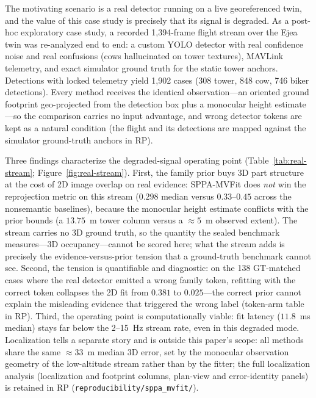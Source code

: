 \documentclass[11pt,a4paper]{article}
\begin{document}
The motivating scenario is a real detector running on a live georeferenced
twin, and the value of this case study is precisely that its signal is
degraded. As a post-hoc exploratory case study, a recorded 1{,}394-frame
flight
stream over the Ejea twin was re-analyzed end to end: a custom YOLO detector
with real confidence noise and real confusions (cows hallucinated on tower
textures), MAVLink telemetry, and exact simulator ground truth for the
static tower anchors. Detections with locked telemetry yield 1{,}902 cases
(308 tower, 848 cow, 746 biker detections). Every method receives the
identical observation---an oriented ground footprint geo-projected from the
detection box plus a monocular height estimate---so the comparison carries
no input advantage, and wrong detector tokens are kept as a natural
condition (the flight and its detections are mapped against the simulator
ground-truth anchors in RP).

Three findings characterize the degraded-signal operating point
(Table~\ref{tab:real-stream}; Figure~\ref{fig:real-stream}). First, the
family prior buys 3D part structure at the cost of 2D image overlap on real
evidence: SPPA-MVFit does \emph{not} win the reprojection metric on this
stream (\(0.298\)
median versus \(0.33\)--\(0.45\) across the nonsemantic baselines), because the monocular
height estimate conflicts with the prior bounds (a \(13.75\)~m tower column
versus
a \(\approx\)\(5\)~m observed extent). The stream carries no 3D ground
truth, so the quantity the sealed benchmark measures---3D occupancy---cannot
be scored here; what the stream adds is precisely the evidence-versus-prior
tension that a ground-truth benchmark cannot see. Second, the tension is
quantifiable and diagnostic: on the 138 GT-matched cases where the real
detector emitted a
wrong family token, refitting with the correct token collapses the 2D fit
from \(0.381\) to \(0.025\)---the correct prior cannot explain the
misleading evidence that triggered the wrong label (token-arm table in
RP). Third, the operating point is computationally
viable: fit latency (\(11.8\)~ms median) stays far below
the 2--15~Hz stream rate, even in this degraded mode. Localization tells a
separate story and is outside this paper's scope: all methods share the same
\(\approx\)\(33\)~m median 3D error, set by the monocular observation
geometry of the low-altitude stream rather than by the fitter; the full
localization analysis (localization and footprint columns, plan-view and
error-identity panels) is retained in RP
(\texttt{reproducibility/sppa\_mvfit/}).
\end{document}
